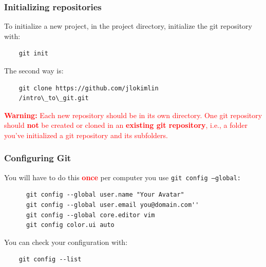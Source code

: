 %
%
\begin{frame}[fragile]
  \frametitle{Initializing repositories
  }

  To initialize a new project, in the project directory, initialize the git repository with:

  \begin{lstlisting}
    git init
  \end{lstlisting}


  The second way is:

  \begin{lstlisting}
    git clone https://github.com/jlokimlin
    /intro\_to\_git.git
  \end{lstlisting}


  \textcolor{red}{
    {\bf Warning:} Each new repository should be in its own directory. One git repository should {\bf not} be created or cloned in an {\bf existing git repository}, i.e., a folder you've initialized a git repository and its subfolders.
  }

\end{frame}

%
%
\begin{frame}[fragile]
  \frametitle{
    Configuring Git
  }

  You will have to do this \textcolor{red}{\bf once} per computer you use {\tt git config --global:}

  {
    \footnotesize
    \begin{lstlisting}
      git config --global user.name "Your Avatar"
      git config --global user.email you@domain.com''
      git config --global core.editor vim
      git config color.ui auto
    \end{lstlisting}
  }
  

  You can check your configuration with:
  \begin{lstlisting}
    git config --list
  \end{lstlisting}


\end{frame}

